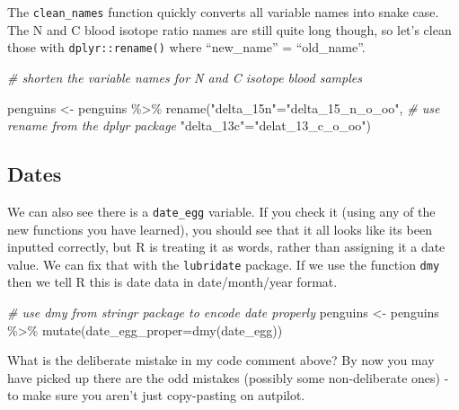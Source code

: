 \documentclass[
]{book}
\makeatletter
\newenvironment{Shaded}{\begin{snugshade}}{\end{snugshade}}
\newcommand{\AttributeTok}[1]{\textcolor[rgb]{0.77,0.63,0.00}{#1}}
\newcommand{\CommentTok}[1]{\textcolor[rgb]{0.56,0.35,0.01}{\textit{#1}}}
\newcommand{\FunctionTok}[1]{\textcolor[rgb]{0.00,0.00,0.00}{#1}}
\newcommand{\NormalTok}[1]{#1}
\newcommand{\OtherTok}[1]{\textcolor[rgb]{0.56,0.35,0.01}{#1}}
\newcommand{\SpecialCharTok}[1]{\textcolor[rgb]{0.00,0.00,0.00}{#1}}
\newcommand{\StringTok}[1]{\textcolor[rgb]{0.31,0.60,0.02}{#1}}
\newenvironment{kframe}{%
\medskip{}
\setlength{\fboxsep}{.8em}
 \def\at@end@of@kframe{}%
 \ifinner\ifhmode%
  \def\at@end@of@kframe{\end{minipage}}%
  \begin{minipage}{\columnwidth}%
 \fi\fi%
 \def\FrameCommand##1{\hskip\@totalleftmargin \hskip-\fboxsep
 \colorbox{shadecolor}{##1}\hskip-\fboxsep
     \hskip-\linewidth \hskip-\@totalleftmargin \hskip\columnwidth}%
 \MakeFramed {\advance\hsize-\width
   \@totalleftmargin\z@ \linewidth\hsize
   \@setminipage}}%
 {\par\unskip\endMakeFramed%
 \at@end@of@kframe}
\newenvironment{block}[1]
  {
  \begin{itemize}
  \renewcommand{\labelitemi}{
    \raisebox{-.7\height}[0pt][0pt]{
      {\setkeys{Gin}{width=3em,keepaspectratio}\texttt{[image: images/\#1]}}
    }
  }
  \setlength{\fboxsep}{1em}
  \begin{kframe}
  \item
  }
  {
  \end{kframe}
  \end{itemize}
  }
\newenvironment{rmdquestion}
  {\begin{block}{question}}
  {\end{block}}
\makeatother
\begin{document}
The \texttt{clean\_names} function quickly converts all variable names into snake case. The N and C blood isotope ratio names are still quite long though, so let's clean those with \texttt{dplyr::rename()} where ``new\_name'' = ``old\_name''.

\begin{Shaded}
\begin{Highlighting}[]
\CommentTok{\# shorten the variable names for N and C isotope blood samples}

\NormalTok{penguins }\OtherTok{\textless{}{-}}\NormalTok{ penguins }\SpecialCharTok{\%\textgreater{}\%} 
  \FunctionTok{rename}\NormalTok{(}\StringTok{"delta\_15n"}\OtherTok{=}\StringTok{"delta\_15\_n\_o\_oo"}\NormalTok{,  }\CommentTok{\# use rename from the dplyr package}
         \StringTok{"delta\_13c"}\OtherTok{=}\StringTok{"delat\_13\_c\_o\_oo"}\NormalTok{)}
\end{Highlighting}
\end{Shaded}

\hypertarget{dates}{%
\subsection{Dates}\label{dates}}

We can also see there is a \texttt{date\_egg} variable. If you check it (using any of the new functions you have learned), you should see that it all looks like its been inputted correctly, but R is treating it as words, rather than assigning it a date value. We can fix that with the \texttt{lubridate} package. If we use the function \texttt{dmy} then we tell R this is date data in date/month/year format.

\begin{Shaded}
\begin{Highlighting}[]
\CommentTok{\# use dmy from stringr package to encode date properly}
\NormalTok{penguins }\OtherTok{\textless{}{-}}\NormalTok{ penguins }\SpecialCharTok{\%\textgreater{}\%} 
  \FunctionTok{mutate}\NormalTok{(}\AttributeTok{date\_egg\_proper=}\FunctionTok{dmy}\NormalTok{(date\_egg))}
\end{Highlighting}
\end{Shaded}

\begin{rmdquestion}
What is the deliberate mistake in my code comment above? By now you may
have picked up there are the odd mistakes (possibly some non-deliberate
ones) - to make sure you aren't just copy-pasting on autpilot.
\end{rmdquestion}
\end{document}
